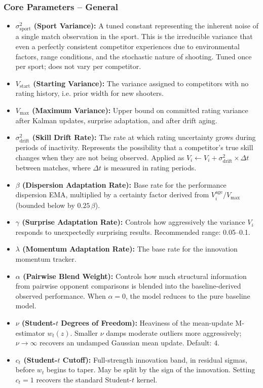 \documentclass[12pt]{article}
\newcommand{\nudof}{\nu}       %
\newcommand{\ctcut}{c_t}       %
\begin{document}
	\subsubsection*{Core Parameters -- General}
	\begin{itemize}
		\item \textbf{$\sigma_{\mathrm{sport}}^2$ (Sport Variance):} A tuned constant representing the inherent noise of a single match observation in the sport. This is the irreducible variance that even a perfectly consistent competitor experiences due to environmental factors, range conditions, and the stochastic nature of shooting. Tuned once per sport; does not vary per competitor.
		\item \textbf{$V_{\mathrm{start}}$ (Starting Variance):} The variance assigned to competitors with no rating history, i.e. prior width for new shooters.
		\item \textbf{$V_{\max}$ (Maximum Variance):} Upper bound on committed rating variance after Kalman updates, surprise adaptation, and after drift aging.
		\item \textbf{$\sigma_{\mathrm{drift}}^2$ (Skill Drift Rate):} The rate at which rating uncertainty grows during periods of inactivity. Represents the possibility that a competitor's true skill changes when they are not being observed. Applied as $V_i \leftarrow V_i + \sigma_{\mathrm{drift}}^2 \times \Delta t$ between matches, where $\Delta t$ is measured in rating periods.
		\item \textbf{$\beta$ (Dispersion Adaptation Rate):} Base rate for the performance dispersion EMA, multiplied by a certainty factor derived from $V_i^{\mathrm{age}}/V_{\max}$ (bounded below by $0.25\,\beta$).
		\item \textbf{$\gamma$ (Surprise Adaptation Rate):} Controls how aggressively the variance $V_i$ responds to unexpectedly surprising results. Recommended range: 0.05--0.1.
		\item \textbf{$\lambda$ (Momentum Adaptation Rate):} The base rate for the innovation momentum tracker.
		\item \textbf{$\alpha$ (Pairwise Blend Weight):} Controls how much structural information from pairwise opponent comparisons is blended into the baseline-derived observed performance. When $\alpha = 0$, the model reduces to the pure baseline model.
		\item \textbf{$\nudof$ (Student-$t$ Degrees of Freedom):} Heaviness of the mean-update M-estimator \(w_t(z)\). Smaller \(\nudof\) damps moderate outliers more aggressively; \(\nudof \to \infty\) recovers an undamped Gaussian mean update. Default: \(4\).
		\item \textbf{$\ctcut$ (Student-$t$ Cutoff):} Full-strength innovation band, in residual sigmas, before \(w_t\) begins to taper. May be split by the sign of the innovation. Setting \(\ctcut = 1\) recovers the standard Student-$t$ kernel.
	\end{itemize}
\end{document}
